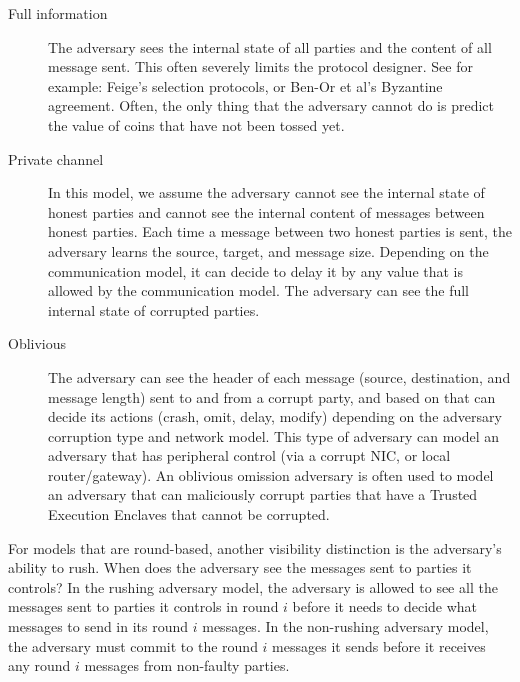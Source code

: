 \begin{description}
    \item[Full information] The adversary sees the internal state of all parties and the content of all
    message sent. 
    This often severely limits the protocol designer. 
    See for example: Feige's selection protocols, or Ben-Or et al's Byzantine agreement.
    Often, the only thing that the adversary cannot do is predict the value of coins that have not been tossed yet.
    
    \item[Private channel] 
    In this model, we assume the adversary cannot see the internal state of honest 
    parties and cannot see the internal content of messages between honest parties. 
    Each time a message between two honest parties is sent, the adversary learns the 
    source, target, and message size. 
    Depending on the communication model, it can decide to delay it by any value that is 
    allowed by the communication model. The adversary can see the full 
    internal state of corrupted parties.

    \item[Oblivious] The adversary can see the header of each message (source, destination, and message 
    length) sent to and from a corrupt party, and based on that can decide its actions 
    (crash, omit, delay, modify) depending on the adversary corruption type and network model. 
    This type of adversary can model an adversary that has peripheral control 
    (via a corrupt NIC, or local router/gateway). 
    An oblivious omission adversary is often used to model an adversary that can maliciously 
    corrupt parties that have a Trusted Execution Enclaves that cannot be corrupted.
\end{description}


For models that are round-based, another visibility distinction is the 
adversary's ability to rush. When does the adversary see the messages sent to 
parties it controls? In the rushing adversary model, the adversary is allowed to see 
all the messages sent to parties it controls in round $i$ before it needs to decide what messages 
to send in its round $i$ messages. In the non-rushing adversary model, the adversary 
must commit to the round $i$ messages it sends before it receives any round $i$ messages from non-faulty parties.

